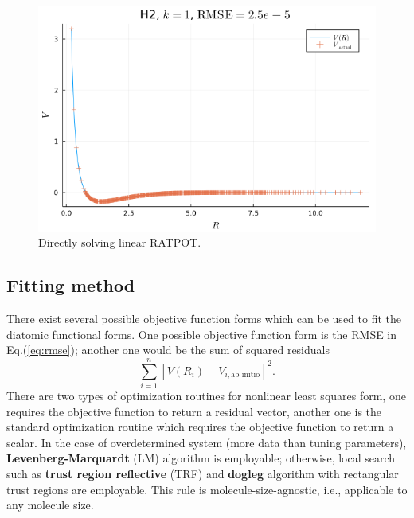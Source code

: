 \documentclass[12pt]{article}
\begin{document}
\begin{figure}[H]
    \centering
    \includegraphics[scale=0.7]{img/linear_RATPOT/linratpot_linsolve_H2_example3.png}
    \caption{Directly solving linear RATPOT.}
    \label{fig:linratpot_linsolve}
\end{figure}


\subsection{Fitting method}
There exist several possible objective function forms which can be used to fit the diatomic functional forms. One possible objective function form is the RMSE in Eq.(\ref{eq:rmse}); another one would be the sum of squared residuals
\begin{equation}
    \sum^n_{i=1}\left[V(R_i) - V_{i,\text{ab initio}}\right]^2.
    \label{eq:sumsquaredresidual}
\end{equation}
There are two types of optimization routines for nonlinear least squares form, one requires the objective function to return a residual vector, another one is the standard optimization routine which requires the objective function to return a scalar. In the case of overdetermined system (more data than tuning parameters), \textbf{Levenberg-Marquardt} (LM) algorithm \cite{lm} is employable; otherwise, local search such as \textbf{trust region reflective} (TRF) \cite{trf} and \textbf{dogleg} algorithm with rectangular trust regions \cite{dogbox} are employable. This rule is molecule-size-agnostic, i.e., applicable to any molecule size.
\end{document}

